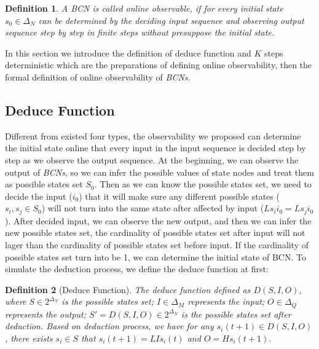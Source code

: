 \documentclass[conference]{IEEEtran} %
\newtheorem{definition}{Definition}
\newcommand{\tl}[1]{\textcolor{blue} {TL: #1 :TL} }
\begin{document}
\begin{definition}
	A {\em BCN} is called online observable, if for every initial state $s_0 \in \Delta_N$ can be determined by the deciding input sequence and observing output sequence step by step in finite steps without presuppose the  initial state.
\end{definition}


In this section we introduce the definition of deduce function and $K$ steps deterministic which are the preparations of defining online observability, then the formal definition of online observability of {\em BCNs}. 
\subsection{Deduce Function}
Different from existed four types, the observability we proposed can determine the initial state online that every input in the input sequence is decided step by step as we observe the output sequence. At the beginning, we can observe the output of {\em BCNs}, so we can infer the possible values of state nodes and treat them as possible states set $S_0$. Then as we can know the possible states set, we need to decide the input ($i_0$) that it will make sure any different possible states ($s_i, s_j \in S_0$) will not turn into the same state after affected by input ($Ls_i i_0=Ls_j i_0$). After decided input, we can observe the new output, and then we can infer the new possible states set, the cardinality of possible states set after input will not lager than the cardinality of possible states set before input. If the cardinality of possible states set turn into be 1, we can determine the initial state of BCN. To simulate the deduction process, we define the deduce function  at first:
\begin{definition}[Deduce Function] The deduce function defined as $D\left(S, I, O\right)$, where $S\in 2^{\Delta_N}$ is the possible states set; $I\in\Delta_M$ represents the input; $O\in\Delta_Q$ represents the output; $S'=D\left(S, I, O\right)\in 2^{\Delta_N}$ is the possible states set after deduction. Based on deduction process, we have for any $s_i(t+1)\in D\left(S, I, O\right)$, there exists $s_i\in S$ that $s_i(t+1)=LIs_i(t)$ and $O=Hs_i(t+1)$.
\end{definition}
\end{document}
